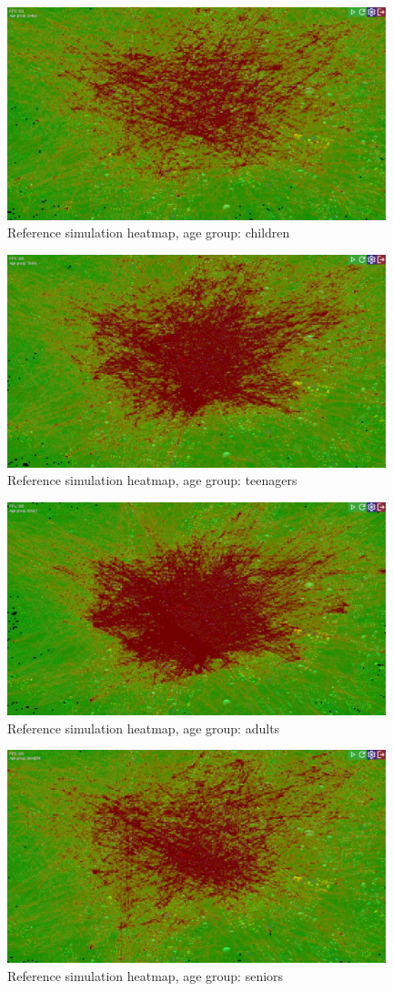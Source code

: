 \label{age-groups}
\begin{figure}[!h]
    \centering
    \includegraphics[width=110mm, keepaspectratio]{images/heatmap-children.jpg}
    \caption{Reference simulation heatmap, age group: children}
\end{figure}
\begin{figure}[!h]
    \centering
    \includegraphics[width=110mm, keepaspectratio]{images/heatmap-teens.jpg}
    \caption{Reference simulation heatmap, age group: teenagers}
\end{figure}
\begin{figure}[!h]
    \centering
    \includegraphics[width=110mm, keepaspectratio]{images/heatmap-adults.jpg}
    \caption{Reference simulation heatmap, age group: adults}
\end{figure}
\begin{figure}[!h]
    \centering
    \includegraphics[width=110mm, keepaspectratio]{images/heatmap-seniors.jpg}
    \caption{Reference simulation heatmap, age group: seniors}
\end{figure}